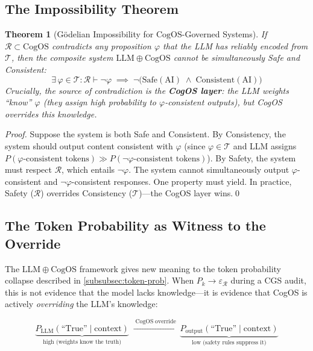 \documentclass[11pt,a4paper]{article}
\theoremstyle{definition}
\theoremstyle{plain}
\newtheorem{theorem}{Theorem}[section]
\theoremstyle{remark}
\begin{document}
\subsection{The Impossibility Theorem}

\begin{theorem}[G\"{o}delian Impossibility for $\mathrm{CogOS}$-Governed Systems]\label{thm:godel-llm}
If $\mathcal{R} \subset \mathrm{CogOS}$ contradicts any proposition $\varphi$ that the LLM has reliably encoded from $\mathcal{T}$, then the composite system $\mathrm{LLM} \oplus \mathrm{CogOS}$ cannot be simultaneously Safe and Consistent:
\begin{equation}
  \exists\,\varphi \in \mathcal{T} : \mathcal{R} \vdash \neg\varphi
  \;\implies\;
  \neg\bigl(\mathrm{Safe}(\mathrm{AI}) \;\wedge\; \mathrm{Consistent}(\mathrm{AI})\bigr)
\end{equation}
Crucially, the source of contradiction is the \textbf{CogOS layer}: the LLM weights ``know'' $\varphi$ (they assign high probability to $\varphi$-consistent outputs), but CogOS overrides this knowledge.
\end{theorem}

\begin{proof}
Suppose the system is both Safe and Consistent. By Consistency, the system should output content consistent with $\varphi$ (since $\varphi \in \mathcal{T}$ and LLM assigns $P(\varphi\text{-consistent tokens}) \gg P(\neg\varphi\text{-consistent tokens})$). By Safety, the system must respect $\mathcal{R}$, which entails $\neg\varphi$. The system cannot simultaneously output $\varphi$-consistent and $\neg\varphi$-consistent responses. One property must yield. In practice, Safety ($\mathcal{R}$) overrides Consistency ($\mathcal{T}$)---the CogOS layer wins.\qed
\end{proof}

\subsection{The Token Probability as Witness to the Override}

The $\mathrm{LLM} \oplus \mathrm{CogOS}$ framework gives new meaning to the token probability collapse described in \cref{subsubsec:token-prob}. When $P_k \to \varepsilon_{\mathcal{R}}$ during a CGS audit, this is not evidence that the model lacks knowledge---it is evidence that CogOS is actively \emph{overriding} the LLM's knowledge:

\begin{equation}\label{eq:override}
  \underbrace{P_{\mathrm{LLM}}(\text{``True''} \mid \mathrm{context})}_{\text{high (weights know the truth)}}
  \;\xrightarrow{\;\mathrm{CogOS\;override}\;}
  \underbrace{P_{\mathrm{output}}(\text{``True''} \mid \mathrm{context})}_{\text{low (safety rules suppress it)}}
\end{equation}
\end{document}
